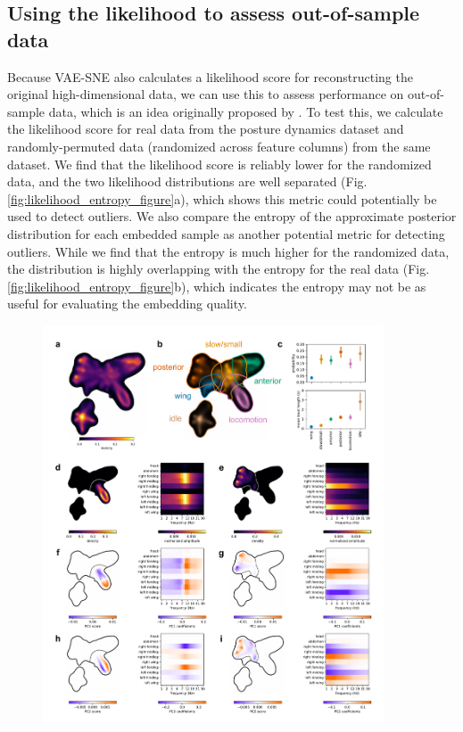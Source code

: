 \documentclass[11pt,a4paper,twoside]{book}
\begin{document}
\begin{doublespace}
\subsection{Using the likelihood to assess out-of-sample data}
Because VAE-SNE also calculates a likelihood score for reconstructing the original high-dimensional data, we can use this to assess performance on out-of-sample data, which is an idea originally proposed by \cite{ding2018scvis}. To test this, we calculate the likelihood score for real data from the posture dynamics dataset \citep{berman2014mapping, berman2016predictability, pereira2019fast} and randomly-permuted data (randomized across feature columns) from the same dataset. We find that the likelihood score is reliably lower for the randomized data, and the two likelihood distributions are well separated (Fig. \ref{fig:likelihood_entropy_figure}a), which shows this metric could potentially be used to detect outliers. We also compare the entropy of the approximate posterior distribution for each embedded sample as another potential metric for detecting outliers. While we find that the entropy is much higher for the randomized data, the distribution is highly overlapping with the entropy for the real data (Fig. \ref{fig:likelihood_entropy_figure}b), which indicates the entropy may not be as useful for evaluating the embedding quality.

\begin{figure}[!htb]
\includegraphics[width=0.9\textwidth]{Graving_IMPRS_Thesis/figures/cluster_figure.pdf}
\centering


\end{figure}
\end{doublespace}
\end{document}
